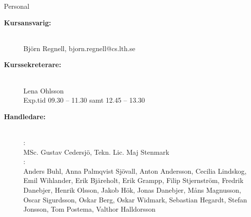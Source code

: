 \ifkompendium\else
\begin{Slide}{Personal}\SlideFontSmall
\begin{description}
\item [\bfseries Kursansvarig:] ~\\Björn Regnell, bjorn.regnell@cs.lth.se
\item [\bfseries Kurssekreterare:]  ~\\Lena Ohlsson \\Exp.tid 09.30 -- 11.30 samt 12.45 -- 13.30
\item [\bfseries Handledare:] ~\\
: \\
MSc. Gustav Cedersjö, Tekn. Lic. Maj Stenmark \\
: \\
Anders Buhl,
Anna Palmqvist Sjövall,
Anton Andersson,
Cecilia Lindskog,
Emil Wihlander,
Erik Bjäreholt,
Erik Grampp,
Filip Stjernström,
Fredrik Danebjer,
Henrik Olsson,
Jakob Hök,
Jonas Danebjer,
Måns Magnusson,
Oscar Sigurdsson,
Oskar Berg,
Oskar Widmark,
Sebastian Hegardt,
Stefan Jonsson,
Tom Postema,
Valthor Halldorsson
\end{description}
\end{Slide}
\fi


